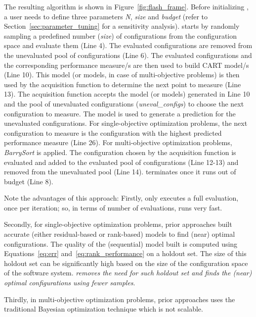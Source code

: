 The resulting algorithm is shown in  Figure~\ref{fig:flash_frame}. 
Before initializing \flash, a user needs to define three parameters \textit{N}, \textit{size} and \textit{budget} (refer to Section~\ref{sec:parameter_tuning} for a sensitivity analysis). \flash starts by randomly sampling a predefined number (\textit{size}) of configurations from the configuration space and evaluate them (Line 4). The evaluated configurations are removed from the unevaluated pool of configurations (Line 6). The evaluated configurations and the corresponding performance measure/s are then used to build CART model/s (Line 10). This model (or models, in case of multi-objective problems) is then used by the acquisition function to determine the next point to measure (Line 13). The acquisition function accepts the model (or models) generated in Line 10 and the pool of unevaluated configurations (\textit{uneval\_configs}) to choose the next configuration to measure. The model is used to generate a prediction for the unevaluated configurations. 
For single-objective optimization problems, the next configuration to measure is the configuration with the highest predicted performance measure (Line 26). For multi-objective optimization problems, 
{\em BarrySort} is applied. The configuration chosen by the acquisition function is evaluated and added to the evaluated pool of configurations (Line 12-13) and removed from the unevaluated pool (Line 14). \flash terminates once it runs out of budget (Line 8). 


Note the advantages of this approach:
Firstly,
\flash only executes a full evaluation, once per iteration; so, in terms of number of evaluations,
\flash  runs very fast. 

Secondly,  
for single-objective optimization problems,   prior approaches built accurate (either residual-based or rank-based) models to find (near) optimal configurations. The quality of the (sequential) model built is computed using Equations~\ref{eq:err} and~\ref{eq:rank_performance} on a holdout set. The size of this holdout set can be significantly high based on the size of the configuration space of the software system. \textit{\flash removes the need for such holdout set and finds the (near) optimal configurations using fewer samples}. 

Thirdly, in multi-objective optimization problems,   prior approaches uses the traditional Bayesian optimization technique which is not scalable. 

